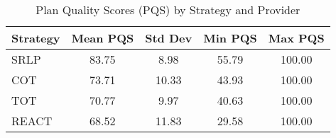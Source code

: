 \begin{table}[htbp]
\centering
\caption{Plan Quality Scores (PQS) by Strategy and Provider}
\label{tab:pqs_by_strategy}
\begin{tabular}{lcccc}
\toprule
Strategy & Mean PQS & Std Dev & Min PQS & Max PQS \\
\midrule
SRLP & 83.75 & 8.98 & 55.79 & 100.00 \\
COT & 73.71 & 10.33 & 43.93 & 100.00 \\
TOT & 70.77 & 9.97 & 40.63 & 100.00 \\
REACT & 68.52 & 11.83 & 29.58 & 100.00 \\
\bottomrule
\end{tabular}
\end{table}